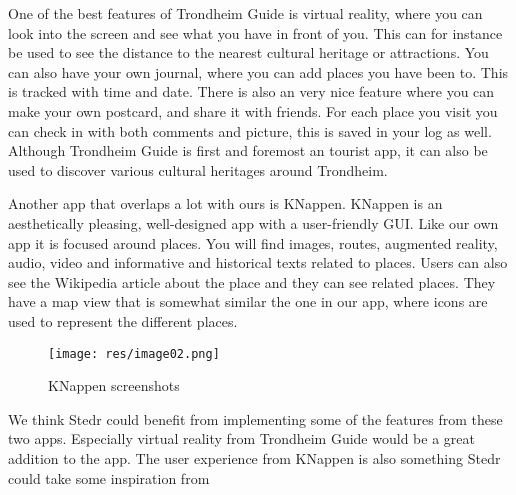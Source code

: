 One of the best features of Trondheim Guide is virtual reality, where you can look into the screen and see what you have in front of you. This can for instance be used to see the distance to the nearest cultural heritage or attractions. You can also have your own journal, where you can add places you have been to. This is tracked with time and date. There is also an very nice feature where you can make your own postcard, and share it with friends. For each place you visit you can check in with both comments and picture, this is saved in your log as well. Although Trondheim Guide is first and foremost an tourist app, it can also be used to discover various cultural heritages around Trondheim.

Another app that overlaps a lot with ours is KNappen. KNappen is an aesthetically pleasing, well-designed app with a user-friendly GUI. Like our own app it is focused around places. You will find images, routes, augmented reality, audio, video and informative and historical texts related to places. Users can also see the Wikipedia article about the place and they can see related places. They have a map view that is somewhat similar the one in our app, where icons are used to represent the different places.


\begin{figure}[h!]
\begin{center}
\texttt{[image: res/image02.png]}
\caption{KNappen screenshots}
\end{center}
\end{figure}


We think Stedr could benefit from implementing some of the features from these two apps. Especially virtual reality from Trondheim Guide would be a great addition to the app. The user experience from KNappen is also something Stedr could take some inspiration from
